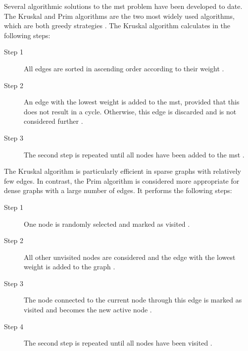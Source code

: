 Several algorithmic solutions to the \acrshort{mst} problem have been developed to date. The Kruskal and Prim algorithms are the two most widely used algorithms, which are both greedy strategies \cite{Sal1}.
The Kruskal algorithm calculates  in the following steps:

\begin{description}
    \item[Step 1] All edges are sorted in ascending order according to their weight \cite{Sal1}.
    \item[Step 2] An edge with the lowest weight is added to the \acrshort{mst}, provided that this does not result in a cycle. Otherwise, this edge is discarded and is not considered further \cite{Sal1}.
    \item[Step 3] The second step is repeated until all nodes have been added to the \acrshort{mst} \cite{Sal1}.
\end{description}

The Kruskal algorithm is particularly efficient in sparse graphs with relatively few edges. In contrast, the Prim algorithm is considered more appropriate for dense graphs with a large number of edges. It performs the following steps:

\begin{description}
    \item[Step 1] One node is randomly selected and marked as visited \cite{Sal1}.
    \item[Step 2] All other unvisited nodes are considered and the edge with the lowest weight is added to the graph \cite{Sal1}.
    \item[Step 3] The node connected to the current node through this edge is marked as visited and becomes the new active node \cite{Sal1}.
    \item[Step 4] The second step is repeated until all nodes have been visited \cite{Sal1}.
\end{description}

